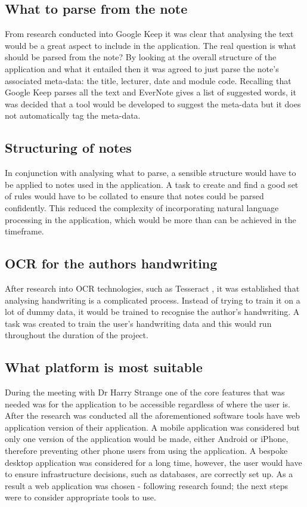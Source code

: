 \subsection{What to parse from the note}
From research conducted into Google Keep it was clear that analysing the text would be a great aspect to include in the application. The real question is what should be parsed from the note? By looking at the overall structure of the application and what it entailed then it was agreed to just parse the note's associated meta-data: the title, lecturer, date and module code. Recalling that Google Keep parses all the text and EverNote gives a list of suggested words, it was decided that a tool would be developed to suggest the meta-data but it does not automatically tag the meta-data.

\subsection{Structuring of notes}
In conjunction with analysing what to parse, a sensible structure would have to be applied to notes used in the application. A task to create and find a good set of rules would have to be collated to ensure that notes could be parsed confidently. This reduced the complexity of incorporating natural language processing in the application, which would be more than can be achieved in the timeframe.


\subsection{OCR for the authors handwriting}
After research into OCR technologies, such as Tesseract \cite{citeulike:14014368}, it was established that analysing handwriting is a complicated process. Instead of trying to train it on a lot of dummy data, it would be trained to recognise the author's handwriting. A task was created to train the user's handwriting data and this would run throughout the duration of the project.


\subsection{What platform is most suitable}
During the meeting with Dr Harry Strange one of the core features that was needed was for the application to be accessible regardless of where the user is. After the research was conducted all the aforementioned software tools have web application version of their application. A mobile application was considered but only one version of the application would be made, either Android or iPhone, therefore preventing other phone users from using the application. A bespoke desktop application was considered for a long time, however, the user would have to ensure infrastructure decisions, such as databases, are correctly set up. As a result a web application was chosen - following research found; the next steps were to consider appropriate tools to use.

